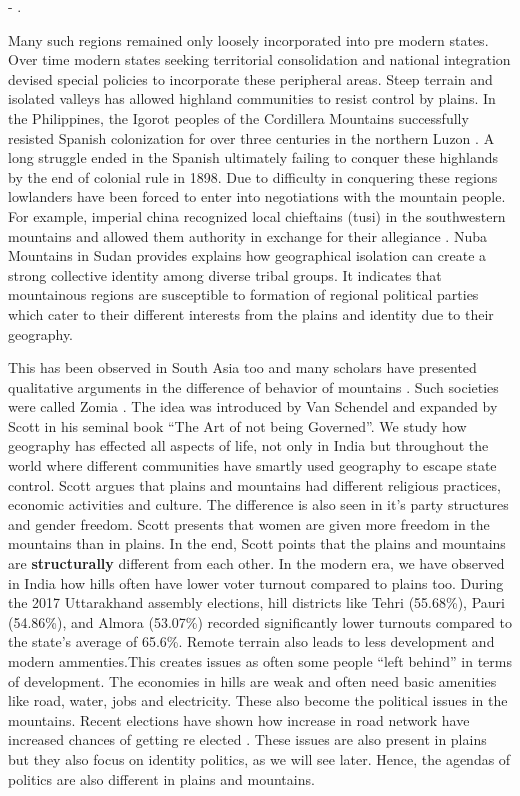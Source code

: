 \hspace*{\fill} - \cite{Hammes2017}. 



Many such regions remained only loosely incorporated into pre modern states. Over time modern states seeking territorial consolidation and national integration devised special policies to incorporate these peripheral areas. Steep terrain and isolated valleys has allowed highland communities to  resist control by plains. In the Philippines, the Igorot peoples of the Cordillera Mountains successfully resisted Spanish colonization for over three centuries in the northern Luzon \citep{scott1970igorot}. A long struggle ended in the Spanish ultimately failing to conquer these highlands by the end of colonial rule in 1898. Due to difficulty in conquering these regions lowlanders have been forced to enter into negotiations with the mountain people. For example, imperial china  recognized local chieftains (tusi) in the southwestern mountains and allowed them authority in exchange for their allegiance \citep{took2005native}. Nuba Mountains in Sudan provides explains how geographical isolation can create a strong collective identity among diverse tribal groups. It indicates that mountainous regions are susceptible to formation of regional political parties which cater to their different interests from the plains and identity due to their geography.

This has been observed in South Asia too and many scholars have presented qualitative arguments in the difference of behavior of mountains \citep{ali2019delusional,murton2013himalayan,alam2008becoming,hussain2015remoteness}. Such societies were called Zomia \citep{van2005geographies}. The idea was introduced by Van Schendel and expanded by Scott in his seminal book ``The Art of not being Governed''. We study how geography has effected all aspects of life, not only in India but throughout the world where different communities have smartly used geography to escape state control. Scott argues that plains and mountains had different religious practices, economic activities and culture. The difference is also seen in it's party structures and gender freedom. Scott presents that women are given more freedom in the mountains than in plains. In the end, Scott points that the plains and mountains are \textbf{structurally} different from each other.  In the modern era, we have observed in India how hills often have lower voter turnout compared to plains too. During the 2017 Uttarakhand assembly elections, hill districts like Tehri (55.68\%), Pauri (54.86\%), and Almora (53.07\%) recorded significantly lower turnouts compared to the state's average of 65.6\%. Remote terrain also leads to less development and modern ammenties.This creates issues as often some people ``left behind'' in terms of development. The economies in hills are weak and often need basic amenities like road, water, jobs and electricity. These also become the political issues in the mountains. Recent elections have shown how increase in road network have increased chances of getting re elected \citep{basistha2024elections}. These issues are also present in plains but they also focus on identity politics, as we will see later. Hence, the agendas of politics are also different in plains and mountains.

